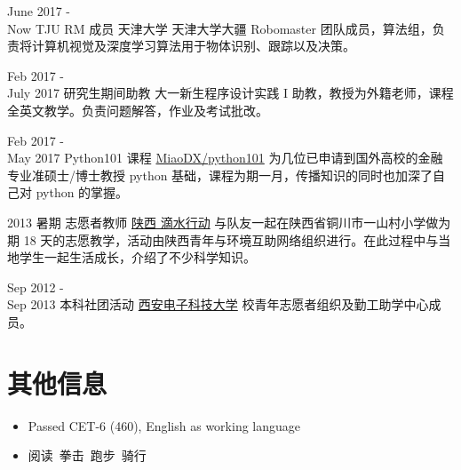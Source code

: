 \documentclass[utf8]{twentysecondcv} %
\begin{document}
%


%   
%

%
%
%   
%
%
%    
%    

\begin{twenty}

\twentyitem
    {June 2017 - \\ Now}
    {TJU RM 成员}
    {天津大学}
    {}
   	{天津大学大疆 Robomaster 团队成员，算法组，负责将计算机视觉及深度学习算法用于物体识别、跟踪以及决策。}

\twentyitem
    {Feb 2017 - \\ July 2017}
    {研究生期间助教}
	{}
    {}
    {大一新生程序设计实践 I 助教，教授为外籍老师，课程全英文教学。负责问题解答，作业及考试批改。}


\twentyitem
    {Feb 2017 - \\ May 2017}
    {Python101 课程}
    {\href{https://github.com/MiaoDX/python101}{MiaoDX/python101}}
    {}
    {为几位已申请到国外高校的金融专业准硕士/博士教授 python 基础，课程为期一月，传播知识的同时也加深了自己对 python 的掌握。}
    
\twentyitem
    {2013 暑期}
    {志愿者教师}
    {\href{http://blog.sina.com.cn/xiaanedu}{陕西 滴水行动}}
    {}
    {与队友一起在陕西省铜川市一山村小学做为期 18 天的志愿教学，活动由陕西青年与环境互助网络组织进行。在此过程中与当地学生一起生活成长，介绍了不少科学知识。}    
    
\twentyitem
    {Sep 2012 - \\ Sep 2013}
    {本科社团活动}
    {\href{http://www.xidian.edu.cn/}{西安电子科技大学}}
    {}
    {校青年志愿者组织及勤工助学中心成员。}

    
\end{twenty}



\section{其他信息}

\begin{twenty} %
    
\twentyitem
    {}
    {}
    {}
    {}
    {        
        {\begin{itemize}
            \item Passed CET-6 (460), English as working language
            \item 阅读\ 拳击\ 跑步\ 骑行     
        \end{itemize}
         }
    }    
        
\end{twenty}
\end{document}
